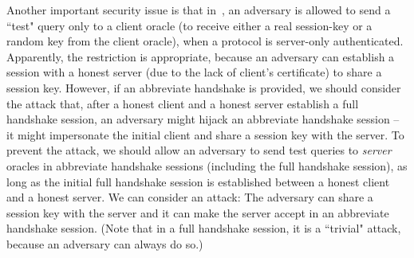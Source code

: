Another important security issue is that in~\cite{FG14:QUIC},
an adversary is allowed to send a ``test" query only to
a client oracle (to receive either a real session-key or
a random key from the client oracle), when a protocol
is server-only authenticated.
Apparently, the restriction is appropriate, because
an adversary can establish a session with a honest
server (due to the lack of client's certificate) to
share a session key.
However, if an abbreviate handshake is provided, we should consider
the attack that, after a honest client and a honest
server establish a full handshake session, an adversary
might hijack an abbreviate handshake session -- it might
impersonate the initial client and share a session key
with the server.
To prevent the attack, we should allow an adversary to
send test queries to \textit{server} oracles in abbreviate
handshake sessions (including the full handshake session), as long
as the initial full handshake session is established
between a honest client and a honest server.
We can consider an attack: The adversary can
share a session key with the server and it can make the
server accept in an abbreviate handshake session. (Note that in a
full handshake session, it is a ``trivial" attack, because
an adversary can always do so.)
\fi
